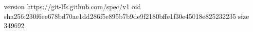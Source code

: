 version https://git-lfs.github.com/spec/v1
oid sha256:230f6ee678bd70ae1dd286f5e895b7b9de9f2180bffe1f30e45018e825232235
size 349692
